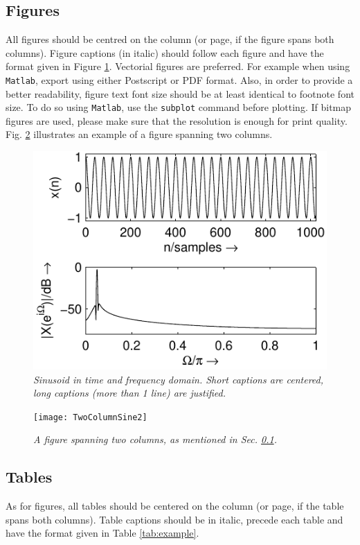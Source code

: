 \documentclass{article}
\begin{document}
\subsection{Figures}
\label{ssec:figures}
All figures should be centred on the column (or page, if the figure spans both columns).
Figure captions (in italic) should follow each figure and have the format given in Figure \ref{fft_plot}.
%
Vectorial figures are preferred. For example when using
\texttt{Matlab}, export using either Postscript or PDF format. Also,
in order to provide a better readability, figure text font size
should be at least identical to footnote font size. To do so using
\texttt{Matlab}, use the \texttt{subplot} command before plotting.
If bitmap figures are used, please make sure that the resolution is
enough for print quality. Fig. \ref{ftt_plot2} illustrates an
example of a figure spanning two columns.
%
\begin{figure}[ht]
\centerline{\includegraphics[scale=0.8]{fft_plot2}}
\caption{\label{fft_plot}{\it Sinusoid in time and frequency domain. Short captions are centered, long captions (more than 1 line) are justified.}}
\end{figure}
%
\begin{figure}[ht]
\center
\texttt{[image: TwoColumnSine2]}
\caption{\label{ftt_plot2}{\it A figure spanning two columns, as mentioned in Sec. \ref{ssec:figures}. }}
\end{figure}


\subsection{Tables}
As for figures, all tables should be centered on the column (or page, if the table spans both columns).
Table captions should be in italic, precede each table and have the format given in Table \ref{tab:example}.
\end{document}
